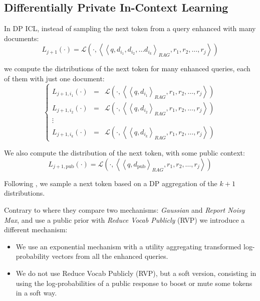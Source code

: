 \documentclass[conference]{IEEEtran}
\begin{document}
\subsection{Differentially Private In-Context
Learning}\label{differentially-private-in-context-learning}

In DP ICL, instead of sampling the next token from a query enhanced with
many documents:
\[L_{j+1}(\cdot) = \mathcal{L}\left(\cdot, \left<\left<q, d_{i_1}, d_{i_2}, \ldots d_{i_k}\right>_{RAG}, r_1, r_2,\ldots, r_j\right>\right)\]

we compute the distributions of the next token for many enhanced
queries, each of them with just one document: \[\left\{\begin{matrix}
L_{j+1,i_1}(\cdot) &=& \mathcal{L}\left(\cdot, \left<\left<q, d_{i_1}\right>_{RAG}, r_1, r_2,\ldots, r_j\right>\right)\\
L_{j+1,i_2}(\cdot) &=&\mathcal{L}\left(\cdot, \left<\left<q, d_{i_2}\right>_{RAG}, r_1, r_2,\ldots, r_j\right>\right)\\
\vdots\\
L_{j+1,i_k}(\cdot) &=&\mathcal{L}\left(\cdot, \left<\left<q, d_{i_k}\right>_{RAG}, r_1, r_2,\ldots, r_j\right>\right)
\end{matrix}\right.\]

We also compute the distribution of the next token, with some public
context:
\[L_{j+1, \text{pub}}(\cdot) = \mathcal{L}\left(\cdot, \left<\left<q, d_\text{pub}\right>_{RAG}, r_1, r_2,\ldots, r_j\right>\right)\]

Following \cite{ref-tang2024privacypreservingincontextlearningdifferentially}, we sample a next token based on a DP
aggregation of the \(k+1\) distributions.

Contrary to \cite{ref-tang2024privacypreservingincontextlearningdifferentially} where they compare two mechanisms:
\emph{Gaussian} and \emph{Report Noisy Max}, and use a public prior with
\emph{Reduce Vocab Publicly} (RVP) we introduce a different mechanism:

\begin{itemize}

\item
  We use an exponential mechanism with a utility aggregating transformed
  log-probability vectors from all the enhanced queries.
\item
  We do not use Reduce Vocab Publicly (RVP), but a soft version,
  consisting in using the log-probabilities of a public response to
  boost or mute some tokens in a soft way.
\end{itemize}
\end{document}

